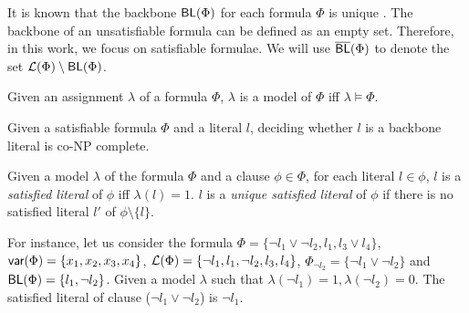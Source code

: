 It is known that the backbone $\textsf{BL}(\Phi)$ for each formula $\Phi$ is unique \cite{JLM15}.
The backbone of an unsatisfiable formula can be defined as an empty set. Therefore, in this work, we focus on satisfiable formulae.
We will use $\overline{\textsf{BL}}(\Phi)$ to denote the set
$\Lit(\Phi)\setminus \BL(\Phi)$.

\begin{definition}
Given an assignment $\lambda$ of a formula $\Phi$, $\lambda$ is a model of $\Phi$ iff $\lambda\models\Phi$.
\end{definition}

\begin{theorem}
\label{thm:co-NP}\cite{Jan10}
Given a satisfiable formula $\Phi$ and a literal $l$, deciding whether $l$ is a backbone literal is co-NP complete.
\end{theorem}

\begin{definition}
Given a model $\lambda$ of the formula $\Phi$ and a clause $\phi\in\Phi$, for each literal $l\in\phi$, $l$ is a \emph{satisfied literal}
of $\phi$ iff $\lambda(l)=1$. $l$ is a \emph{unique satisfied literal} of $\phi$ if there is no satisfied literal $l'$ of $\phi\setminus\{l\}$.
\end{definition}

For instance, let us consider the formula $\Phi=\{\neg l_1 \vee \neg l_2, l_1, l_3 \vee l_4\}$,
$\textsf{var}(\Phi)=\{x_1, x_2, x_3, x_4\}$, $\Lit(\Phi)=\{\neg l_1, l_1, \neg l_2, l_3, l_4\}$, $\Phi_{\neg l_2}=\{\neg l_1 \vee \neg l_2\}$ and $\textsf{BL}(\Phi)=\{l_1, \neg l_2\}$.
Given a model $\lambda$ such that $\lambda(\neg l_1)=1,\lambda(\neg l_2)=0$. The satisfied literal of clause ($\neg l_1\vee\neg l_2$) is $\neg l_1$.

\iffalse
Given a formula $\Phi$ and a literal $l$, let $\Cnt(\Phi,l)$ denote the number of occurrence of $l$ in $\Phi$.
The \emph{density} $\dens(\Phi,l)$ of $l$ in $\Phi$ is defined as
\[
\dens(\Phi, l)=\frac{\Cnt(\Phi,l)}{\|\Phi_l\|}.
\]
\fi
